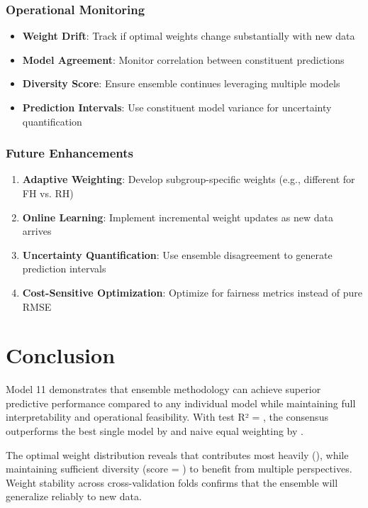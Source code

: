 \subsubsection{Operational Monitoring}

\begin{itemize}
    \item \textbf{Weight Drift}: Track if optimal weights change substantially with new data
    \item \textbf{Model Agreement}: Monitor correlation between constituent predictions
    \item \textbf{Diversity Score}: Ensure ensemble continues leveraging multiple models
    \item \textbf{Prediction Intervals}: Use constituent model variance for uncertainty quantification
\end{itemize}

\subsubsection{Future Enhancements}

\begin{enumerate}
    \item \textbf{Adaptive Weighting}: Develop subgroup-specific weights (e.g., different for FH vs. RH)
    \item \textbf{Online Learning}: Implement incremental weight updates as new data arrives
    \item \textbf{Uncertainty Quantification}: Use ensemble disagreement to generate prediction intervals
    \item \textbf{Cost-Sensitive Optimization}: Optimize for fairness metrics instead of pure RMSE
\end{enumerate}

\section{Conclusion}

Model 11 demonstrates that ensemble methodology can achieve superior predictive performance compared to any individual model while maintaining full interpretability and operational feasibility. With test R² = \ModelElevenRSquaredTest{}, the consensus outperforms the best single model by \ModelElevenImprovementVsBest{} and naive equal weighting by \ModelElevenImprovementOverEqual{}.

The optimal weight distribution reveals that \ModelElevenTopContributor{} contributes most heavily (\ModelElevenTopWeight{}), while maintaining sufficient diversity (score = \ModelElevenDiversityScore{}) to benefit from multiple perspectives. Weight stability across cross-validation folds confirms that the ensemble will generalize reliably to new data.

